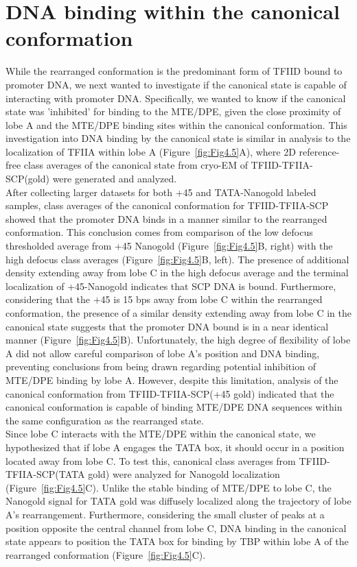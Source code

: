 \section{DNA binding within the canonical conformation}

While the rearranged conformation is the predominant form of TFIID bound to promoter DNA, we next wanted to investigate if the canonical state is capable of interacting with promoter DNA. Specifically, we wanted to know if the canonical state was 'inhibited' for binding to the MTE/DPE, given the close proximity of lobe A and the MTE/DPE binding sites within the canonical conformation. This investigation into DNA binding by the canonical state is similar in analysis to the localization of TFIIA within lobe A (Figure~\ref{fig:Fig4.5}A), where 2D reference-free class averages of the canonical state from cryo-EM of TFIID-TFIIA-SCP(gold) were generated and analyzed. \\
\indent After collecting larger datasets for both +45 and TATA-Nanogold labeled samples, class averages of the canonical conformation for TFIID-TFIIA-SCP showed that the promoter DNA binds in a manner similar to the rearranged conformation. This conclusion comes from comparison of the low defocus thresholded average from +45 Nanogold (Figure~\ref{fig:Fig4.5}B, right) with the high defocus class averages (Figure~\ref{fig:Fig4.5}B, left). The presence of additional density extending away from lobe C in the high defocus average and the terminal localization of +45-Nanogold indicates that SCP DNA is bound. Furthermore, considering that the +45 is 15 bps away from lobe C within the rearranged conformation, the presence of a similar density extending away from lobe C in the canonical state suggests that the promoter DNA bound is in a near identical manner (Figure~\ref{fig:Fig4.5}B). Unfortunately, the high degree of flexibility of lobe A did not allow careful comparison of lobe A's position and DNA binding, preventing conclusions from being drawn regarding potential inhibition of MTE/DPE binding by lobe A. However, despite this limitation, analysis of the canonical conformation from TFIID-TFIIA-SCP(+45 gold) indicated that the canonical conformation is capable of binding MTE/DPE DNA sequences within the same configuration as the rearranged state.\\
\indent Since lobe C interacts with the MTE/DPE within the canonical state, we hypothesized that if lobe A engages the TATA box, it should occur in a position located away from lobe C. To test this, canonical class averages from TFIID-TFIIA-SCP(TATA gold) were analyzed for Nanogold localization (Figure~\ref{fig:Fig4.5}C). Unlike the stable binding of MTE/DPE to lobe C, the Nanogold signal for TATA gold was diffusely localized along the trajectory of lobe A's rearrangement. Furthermore, considering the small cluster of peaks at a position opposite the central channel from lobe C, DNA binding in the canonical state appears to position the TATA box for binding by TBP within lobe A of the rearranged conformation (Figure~\ref{fig:Fig4.5}C). \\
